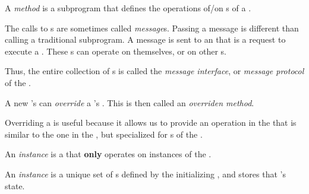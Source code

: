 \begin{definition}[Method]\label{def:OOP_Method}
  A \emph{method} is a subprogram that defines the operations of/on s of a .
\end{definition}

\begin{definition}[Message]\label{def:OOP_Message}
  The calls to s are sometimes called \emph{message}s.
  Passing a message is different than calling a traditional subprogram.
  A message is sent to an  that is a request to execute a .
  These s can operate on themselves, or on other s.
\end{definition}

\begin{definition}\label{def:OOP_Message_Interface}
  Thus, the entire collection of s is called the \emph{message interface}, or \emph{message protocol} of the .
\end{definition}

\begin{definition}[Override]\label{def:OOP_Override}
  A new 's  can \emph{override} a 's .
  This is then called an \emph{overriden method}.

  Overriding a  is useful because it allows us to provide an operation in the  that is similar to the one in the , but specialized for s of the .
\end{definition}

\begin{definition}\label{def:OOP_Instance_Method}
  An \emph{instance } is a  that \textbf{only} operates on instances of the .
\end{definition}

\begin{definition}\label{def:OOP_Instance_Variable}
  An \emph{instance } is a unique set of s defined by the initializing , and stores that 's state.
\end{definition}

